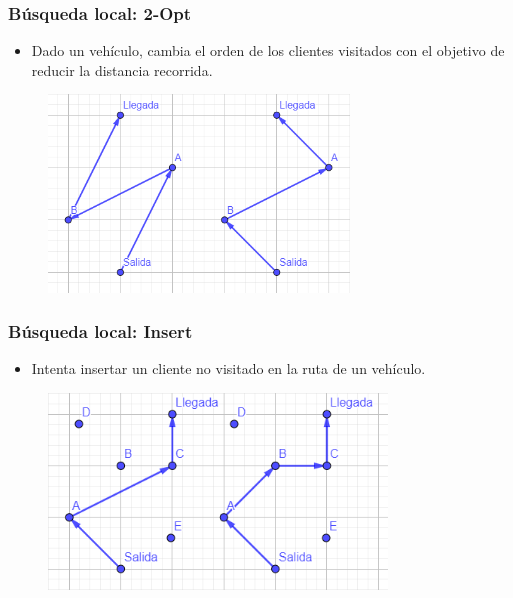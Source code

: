 \documentclass{beamer}
\begin{document}

\begin{frame}
\frametitle{Búsqueda local: 2-Opt}

\begin{itemize}
    \item Dado un vehículo, cambia el orden de los clientes visitados con el objetivo de reducir la distancia recorrida.
\end{itemize}

\begin{figure}[h]
	\centering
	\includegraphics[width=8cm]{bl2opt}
	\label{fig:bl2opt}
\end{figure}

\end{frame}


\begin{frame}
\frametitle{Búsqueda local: Insert}

\begin{itemize}
    \item Intenta insertar un cliente no visitado en la ruta de un vehículo.
\end{itemize}

\begin{figure}[h]
	\centering
	\includegraphics[width=9cm]{blinsert}
	\label{fig:blinsert}
\end{figure}

\end{frame}
\end{document}

